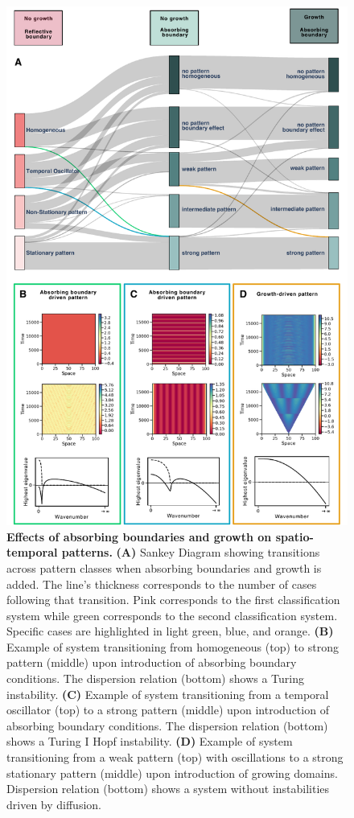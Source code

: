 \documentclass[10pt,letterpaper]{article}
\begin{document}
\begin{figure}[H]
    \includegraphics[width=1\textwidth]{figures/boundaries_growth} %
    \vspace{2pt}
    \caption{\textbf{Effects of absorbing boundaries and growth on spatio-temporal patterns.} \textbf{(A)} Sankey Diagram showing transitions across pattern classes when absorbing boundaries and growth is added. The line's thickness corresponds to the number of cases following that transition. Pink corresponds to the first classification system while green corresponds to the second classification system. Specific cases are highlighted in light green, blue, and orange. \textbf{(B)} Example of system transitioning from homogeneous (top) to strong pattern (middle) upon introduction of absorbing boundary conditions. The dispersion relation (bottom) shows a Turing instability. \textbf{(C)} Example of system transitioning from a temporal oscillator (top) to a strong pattern (middle) upon introduction of absorbing boundary conditions. The dispersion relation (bottom) shows a Turing I Hopf instability. \textbf{(D)} Example of system transitioning from a weak pattern (top) with oscillations to a strong stationary pattern (middle) upon introduction of growing domains. Dispersion relation (bottom) shows a system without instabilities driven by diffusion.}
    \label{fig:boundariesgrowth}
\end{figure}
\end{document}

